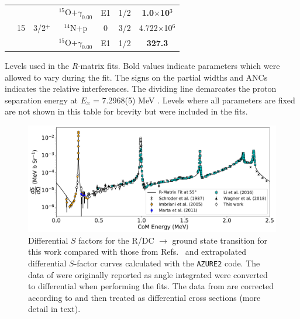 \begin{table}[]
\begin{center}
\begin{threeparttable}
\begin{tabular}{c  c  c  c  c  c  c}
	&	&	&	$^{15}$O+$\gamma_{0.00}$	&	E1	&	1/2	&	\textbf{1.0$\times$10$^{3}$}	\\
& {15}	&	3/2$^+$	&	$^{14}$N+p	&	0	&	3/2	&	{4.722$\times$10$^6$}\\
	&	&	&	$^{15}$O+$\gamma_{0.00}$	&	E1	&	1/2	&	\textbf{327.3}	\\
\end{tabular}
\begin{tablenotes}
\small 
\item Levels used in the \textit{R}-matrix fits. Bold values indicate parameters which were allowed to vary during the fit. The signs on the partial widths and ANCs indicates the relative interferences. The dividing line demarcates the proton separation energy at $E_x$ = 7.2968(5) MeV \cite{Ajzenberg-Selove1991}. Levels where all parameters are fixed are not shown in this table for brevity but were included in the fits.
\end{tablenotes}
\end{threeparttable}
\label{table: fitParamsFullFit}
\end{center}
\end{table}  


\begin{figure}
\centering
\includegraphics[width=1.0\columnwidth]{./figures/diff_sfac_000_best_fit.pdf}
\caption{Differential $S$ factors for the R/DC $\rightarrow$ ground state transition for this work compared with those from Refs.~\cite{Imbriani2005, Marta2011, Runkle2005, Schroder1987, Li2016, Wagner2018} and extrapolated differential $S$-factor curves calculated with the \texttt{AZURE2} code. The data of \cite{Imbriani2005, Runkle2005, Marta2011, Wagner2018} were originally reported as angle integrated were converted to differential when performing the fits. The data from \citet{Schroder1987} are corrected according to \citet{Adelberger2011} and then treated as differential cross sections (more detail in text). }
\label{fig: sfactor_best_fit}
\end{figure}

